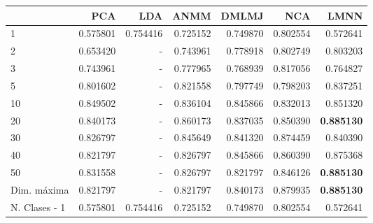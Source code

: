 \begin{tabular}{lrrrrrr}
\toprule
{} &       PCA &       LDA &      ANMM &     DMLMJ &       NCA &      LMNN \\
\midrule
1             &  0.575801 &  0.754416 &  0.725152 &  0.749870 &  0.802554 &  0.572641 \\
2             &  0.653420 &  -        &  0.743961 &  0.778918 &  0.802749 &  0.803203 \\
3             &  0.743961 &  -        &  0.777965 &  0.768939 &  0.817056 &  0.764827 \\
5             &  0.801602 &  -        &  0.821558 &  0.797749 &  0.798203 &  0.837251 \\
10            &  0.849502 &  -        &  0.836104 &  0.845866 &  0.832013 &  0.851320 \\
20            &  0.840173 &  -        &  0.860173 &  0.837035 &  0.850390 &  \textbf{0.885130} \\
30            &  0.826797 &  -        &  0.845649 &  0.841320 &  0.874459 &  0.840390 \\
40            &  0.821797 &  -        &  0.826797 &  0.845866 &  0.860390 &  0.875368 \\
50            &  0.831558 &  -        &  0.826797 &  0.821797 &  0.846126 &  \textbf{0.885130} \\
Dim. máxima   &  0.821797 &  -        &  0.821797 &  0.840173 &  0.879935 &  \textbf{0.885130} \\
N. Clases - 1 &  0.575801 &  0.754416 &  0.725152 &  0.749870 &  0.802554 &  0.572641 \\
\bottomrule
\end{tabular}
